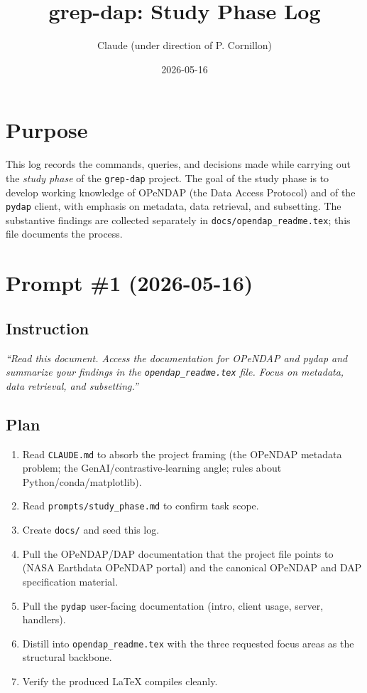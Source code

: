 \documentclass[11pt]{article}
\title{grep-dap: Study Phase Log}
\author{Claude (under direction of P. Cornillon)}
\date{2026-05-16}
\begin{document}
\maketitle

\section*{Purpose}

This log records the commands, queries, and decisions made while carrying
out the \emph{study phase} of the \texttt{grep-dap} project. The goal of
the study phase is to develop working knowledge of OPeNDAP (the Data
Access Protocol) and of the \texttt{pydap} client, with emphasis on
metadata, data retrieval, and subsetting. The substantive findings are
collected separately in
\texttt{docs/opendap\_readme.tex}; this file documents the process.

\section{Prompt \#1 (2026-05-16)}

\subsection*{Instruction}

\emph{``Read this document. Access the documentation for OPeNDAP and pydap
and summarize your findings in the \texttt{opendap\_readme.tex} file.
Focus on metadata, data retrieval, and subsetting.''}

\subsection*{Plan}

\begin{enumerate}
  \item Read \texttt{CLAUDE.md} to absorb the project framing (the
    OPeNDAP metadata problem; the GenAI/contrastive-learning angle;
    rules about Python/conda/matplotlib).
  \item Read \texttt{prompts/study\_phase.md} to confirm task scope.
  \item Create \texttt{docs/} and seed this log.
  \item Pull the OPeNDAP/DAP documentation that the project file
    points to (NASA Earthdata OPeNDAP portal) and the canonical
    OPeNDAP and DAP specification material.
  \item Pull the \texttt{pydap} user-facing documentation (intro,
    client usage, server, handlers).
  \item Distill into \texttt{opendap\_readme.tex} with the three
    requested focus areas as the structural backbone.
  \item Verify the produced LaTeX compiles cleanly.
\end{enumerate}
\end{document}
